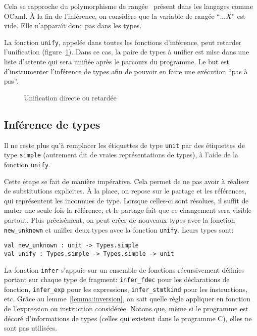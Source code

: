 Cela se rapproche du polymorphisme de rangée~\cite{ocamlObjects} présent dans
les langages comme OCaml. À la fin de l'inférence, on considère que la variable
de rangée \enquote{$…X$} est vide. Elle n'apparaît donc pas dans les types.



La fonction \texttt{unify}, appelée dans toutes les fonctions d'inférence, peut
retarder l'unification (figure~\ref{fig:implem-lazy}). Dans ce cas, la paire de
types à unifier est mise dans une liste d'attente qui sera unifiée après le
parcours du programme. Le but est d'instrumenter l'inférence de types afin de
pouvoir en faire une exécution \enquote{pas à pas}.

\begin{figure}


\caption{Unification directe ou retardée}
\label{fig:implem-lazy}
\end{figure}

\subsection*{Inférence de types}

Il ne reste plus qu'à remplacer les étiquettes de type \texttt{unit} par des
étiquettes de type \texttt{simple} (autrement dit de vraies représentations de
types), à l'aide de la fonction \texttt{unify}.

Cette étape se fait de manière impérative. Cela permet de ne pas avoir à
réaliser de substitutions explicites. À la place, on repose sur le partage et
les références, qui représentent les inconnues de type. Lorsque celles-ci sont
résolues, il suffit de muter une seule fois la référence, et le partage fait que
ce changement sera visible partout. Plus précisément, on peut créer de nouveaux
types avec la fonction \texttt{new\_unknown} et unifier deux types avec la
fonction \texttt{unify}. Leurs types sont:

\begin{verbatim}
val new_unknown : unit -> Types.simple
val unify : Types.simple -> Types.simple -> unit
\end{verbatim}

La fonction \texttt{infer} s'appuie sur un ensemble de fonctions récursivement
définies portant sur chaque type de fragment: \texttt{infer\_fdec} pour les
déclarations de fonction, \texttt{infer\_exp} pour les expressions,
\texttt{infer\_stmtkind} pour les instructions, etc. Grâce au
lemme~\ref{lemma:inversion}, on sait quelle règle appliquer en fonction de
l'expression ou instruction considérée. Notons que, même si le programme
\newspeak est décoré d'informations de types (celles qui existent dans le
programme C), elles ne sont pas utilisées.

